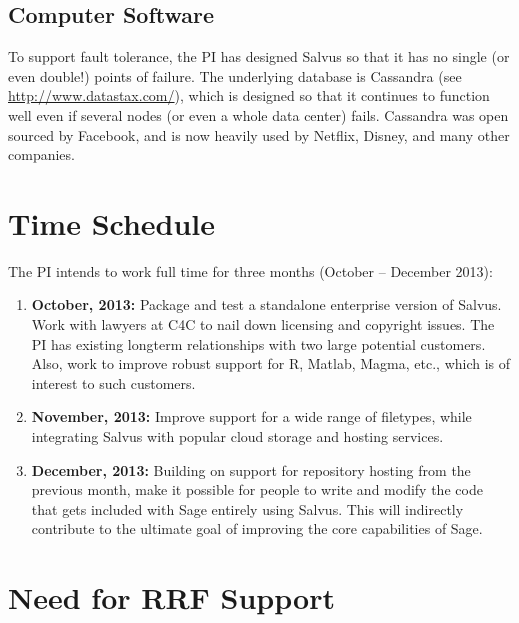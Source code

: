 \documentclass[11pt]{article}
\begin{document}
\subsection{Computer Software}
To support fault tolerance, the PI has designed Salvus so that it has
no single (or even double!) points of failure.  The underlying
database is Cassandra (see \url{http://www.datastax.com/}), which is
designed so that it continues to function well even if several nodes
(or even a whole data center) fails.  Cassandra was open sourced by
Facebook, and is now heavily used by Netflix, Disney, and many other
companies.




\section{Time Schedule}

The PI intends to work full time for three months (October -- December 2013):

\begin{enumerate}
\item {\bf October, 2013:} Package and test a standalone enterprise
  version of Salvus.  Work with lawyers at C4C to nail down licensing
  and copyright issues. The PI has existing longterm relationships
  with two large potential customers.  Also, work to improve robust
  support for R, Matlab, Magma, etc., which is of interest to such
  customers.
\item {\bf November, 2013:} Improve support for a wide range of
  filetypes, while integrating Salvus with popular cloud storage and
  hosting services.
\item {\bf December, 2013:} Building on support for repository hosting
  from the previous month, make it possible for people to write and
  modify the code that gets included with Sage entirely using Salvus.
  This will indirectly contribute to the ultimate goal of improving
  the core capabilities of Sage.
\end{enumerate}


\section{Need for RRF Support}
\end{document}
